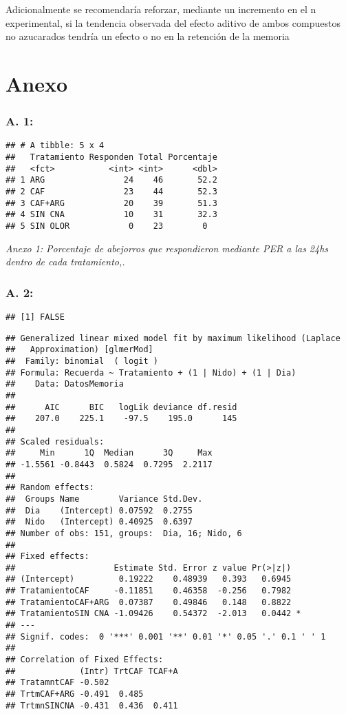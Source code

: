\documentclass[
  11pt,
]{article}
\begin{document}
Adicionalmente se recomendaría reforzar, mediante un incremento en el n
experimental, si la tendencia observada del efecto aditivo de ambos
compuestos no azucarados tendría un efecto o no en la retención de la
memoria

\section{Anexo}\label{anexo}

\subsubsection{A. 1:}\label{a.-1}

\begin{verbatim}
## # A tibble: 5 x 4
##   Tratamiento Responden Total Porcentaje
##   <fct>           <int> <int>      <dbl>
## 1 ARG                24    46       52.2
## 2 CAF                23    44       52.3
## 3 CAF+ARG            20    39       51.3
## 4 SIN CNA            10    31       32.3
## 5 SIN OLOR            0    23        0
\end{verbatim}

\emph{Anexo 1: Porcentaje de abejorros que respondieron mediante PER a
las 24hs dentro de cada tratamiento,.}

\subsubsection{A. 2:}\label{a.-2}

\begin{verbatim}
## [1] FALSE
\end{verbatim}

\begin{verbatim}
## Generalized linear mixed model fit by maximum likelihood (Laplace
##   Approximation) [glmerMod]
##  Family: binomial  ( logit )
## Formula: Recuerda ~ Tratamiento + (1 | Nido) + (1 | Dia)
##    Data: DatosMemoria
## 
##      AIC      BIC   logLik deviance df.resid 
##    207.0    225.1    -97.5    195.0      145 
## 
## Scaled residuals: 
##     Min      1Q  Median      3Q     Max 
## -1.5561 -0.8443  0.5824  0.7295  2.2117 
## 
## Random effects:
##  Groups Name        Variance Std.Dev.
##  Dia    (Intercept) 0.07592  0.2755  
##  Nido   (Intercept) 0.40925  0.6397  
## Number of obs: 151, groups:  Dia, 16; Nido, 6
## 
## Fixed effects:
##                    Estimate Std. Error z value Pr(>|z|)  
## (Intercept)         0.19222    0.48939   0.393   0.6945  
## TratamientoCAF     -0.11851    0.46358  -0.256   0.7982  
## TratamientoCAF+ARG  0.07387    0.49846   0.148   0.8822  
## TratamientoSIN CNA -1.09426    0.54372  -2.013   0.0442 *
## ---
## Signif. codes:  0 '***' 0.001 '**' 0.01 '*' 0.05 '.' 0.1 ' ' 1
## 
## Correlation of Fixed Effects:
##             (Intr) TrtCAF TCAF+A
## TratamntCAF -0.502              
## TrtmCAF+ARG -0.491  0.485       
## TrtmnSINCNA -0.431  0.436  0.411
\end{verbatim}
\end{document}
